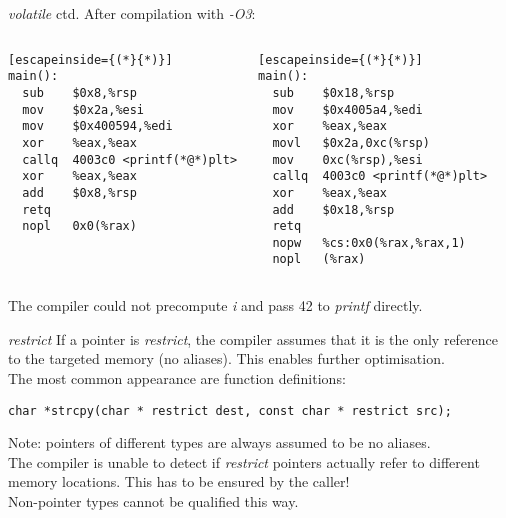 \begin{frame}[fragile = singleslide]{\textit{volatile} ctd.}
After compilation with \textit{-O3}:
\begin{columns}
	\begin{lstlisting}[escapeinside={(*}{*)}]
main():
  sub    $0x8,%rsp
  mov    $0x2a,%esi
  mov    $0x400594,%edi
  xor    %eax,%eax
  callq  4003c0 <printf(*@*)plt>
  xor    %eax,%eax
  add    $0x8,%rsp
  retq   
  nopl   0x0(%rax)
\end{lstlisting}
	\begin{lstlisting}[escapeinside={(*}{*)}]
main():
  sub    $0x18,%rsp
  mov    $0x4005a4,%edi
  xor    %eax,%eax
  movl   $0x2a,0xc(%rsp) 
  mov    0xc(%rsp),%esi
  callq  4003c0 <printf(*@*)plt>
  xor    %eax,%eax
  add    $0x18,%rsp
  retq   
  nopw   %cs:0x0(%rax,%rax,1)
  nopl   (%rax)
\end{lstlisting}
\end{columns}
\bigskip
\pause
The compiler could not precompute \textit{i} and pass 42 to \textit{printf} directly.
\end{frame}

\begin{frame}[fragile = singleslide]{\textit{restrict}}
If a pointer is \textit{restrict}, the compiler assumes that it is the only reference\\
to the targeted memory (no aliases). This enables further optimisation.\\
\bigskip
The most common appearance are function definitions:
\begin{lstlisting}[basicstyle=\scriptsize]
char *strcpy(char * restrict dest, const char * restrict src);
\end{lstlisting}
Note: pointers of different types are always assumed to be no aliases.\\
\bigskip
The compiler is unable to detect if \textit{restrict} pointers actually refer to different memory locations. This has to be ensured by the caller!\\
\bigskip
Non-pointer types cannot be qualified this way.
\end{frame}



